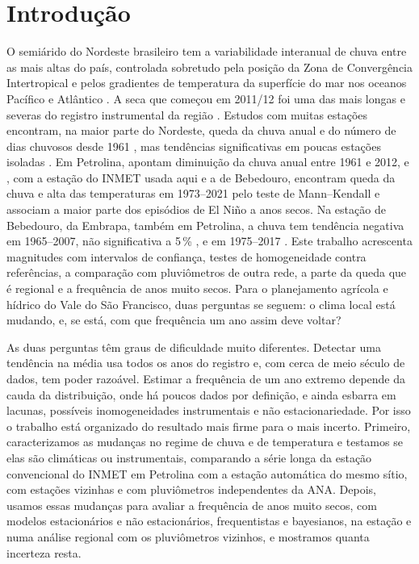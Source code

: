 \documentclass[11pt,a4paper]{article}
\begin{document}
\section{Introdução}\label{sec:intro}

O semiárido do Nordeste brasileiro tem a variabilidade interanual de chuva entre as mais
altas do país, controlada sobretudo pela posição da Zona de Convergência Intertropical e
pelos gradientes de temperatura da superfície do mar nos oceanos Pacífico e Atlântico
\parencite{hastenrath1977,moura1981}. A seca que começou em 2011/12 foi uma das mais longas
e severas do registro instrumental da região \parencite{marengo2017,brito2018,cunha2019}.
Estudos com muitas estações encontram, na maior parte do Nordeste, queda da chuva anual e do número
de dias chuvosos desde 1961 \parencite{costa2020}, mas tendências significativas em poucas
estações isoladas \parencite{carvalho2020}. Em Petrolina, \textcite{jatoba2017} apontam diminuição
da chuva anual entre 1961 e 2012, e \textcite{pimentel2022}, com a estação do INMET usada aqui e a
de Bebedouro, encontram queda da chuva e alta das temperaturas em 1973--2021 pelo teste de
Mann--Kendall e associam a maior parte dos episódios de El Niño a anos secos. Na estação de
Bebedouro, da Embrapa, também em Petrolina, a chuva tem tendência negativa em 1965--2007, não
significativa a 5\,\% \parencite{lacerda2010}, e em 1975--2017 \parencite{gois2024}. Este
trabalho acrescenta magnitudes com intervalos de confiança, testes de homogeneidade contra
referências, a comparação com pluviômetros de outra rede, a parte da queda que é regional e a
frequência de anos muito secos.
Para o planejamento agrícola e hídrico do Vale do São Francisco, duas perguntas se seguem: o
clima local está mudando, e, se está, com que frequência um ano assim deve voltar?

As duas perguntas têm graus de dificuldade muito diferentes. Detectar uma tendência na média
usa todos os anos do registro e, com cerca de meio século de dados, tem poder razoável.
Estimar a frequência de um ano extremo depende da cauda da distribuição, onde há poucos dados
por definição, e ainda esbarra em lacunas, possíveis inomogeneidades instrumentais e não
estacionariedade. Por isso o trabalho está organizado do resultado mais firme para o mais
incerto. Primeiro, caracterizamos as mudanças no regime de chuva e de temperatura e testamos se
elas são climáticas ou instrumentais, comparando a série longa da estação convencional do INMET
em Petrolina com a estação automática do mesmo sítio, com estações vizinhas e com pluviômetros
independentes da ANA. Depois, usamos
essas mudanças para avaliar a frequência de anos muito secos, com modelos estacionários e não
estacionários, frequentistas e bayesianos, na estação e numa análise regional com os
pluviômetros vizinhos, e mostramos quanta incerteza resta.
\end{document}
